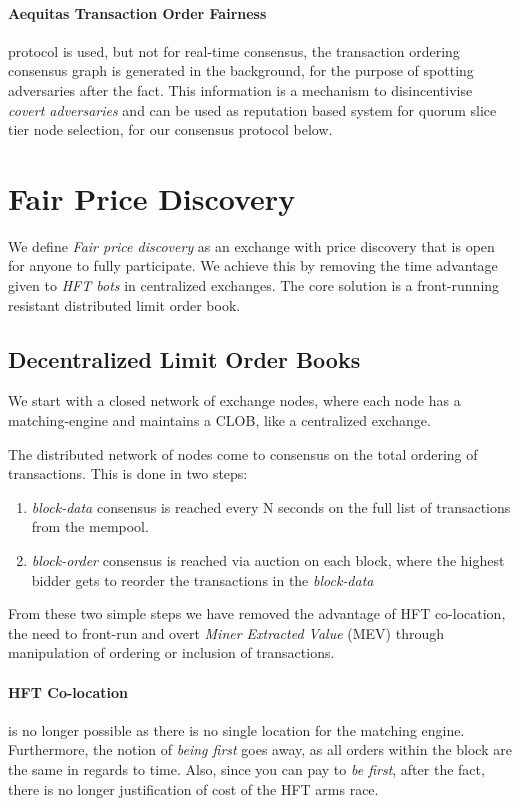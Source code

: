 \documentclass[12pt]{article}
\begin{document}
\paragraph{Aequitas Transaction Order Fairness} protocol is used, but not for real-time consensus, the transaction ordering consensus graph is generated in the background, for the purpose of spotting adversaries after the fact. This information is a mechanism to disincentivise \emph{covert adversaries} and can be used as reputation based system for quorum slice tier node selection, for our consensus protocol below.    

\section{Fair Price Discovery} 
We define \emph{Fair price discovery} as an exchange with price discovery that is open for anyone to fully participate. We achieve this by removing the time advantage given to \emph{HFT bots} in centralized exchanges. The core solution is a front-running resistant distributed limit order book.  

\subsection*{Decentralized Limit Order Books}
We start with a closed network of exchange nodes, where each node has a matching-engine and maintains a CLOB, like a centralized exchange. 

The distributed network of nodes come to consensus on the total ordering of transactions. This is done in two steps: 

\begin{enumerate}
    \item \emph{block-data} consensus is reached every N seconds on the full list of transactions from the mempool. 
    \item \emph{block-order} consensus is reached via auction on each block, where the highest bidder gets to reorder the transactions in the \emph{block-data} 
\end{enumerate}

From these two simple steps we have removed the advantage of HFT co-location, the need to front-run and overt \emph{Miner Extracted Value} (MEV) through manipulation of ordering or inclusion of transactions.

\paragraph*{HFT Co-location} is no longer possible as there is no single location for the matching engine. Furthermore, the notion of \emph{being first} goes away, as all orders within the block are the same in regards to time. Also, since you can pay to \emph{be first}, after the fact, there is no longer justification of cost of the HFT arms race. 
\end{document}
